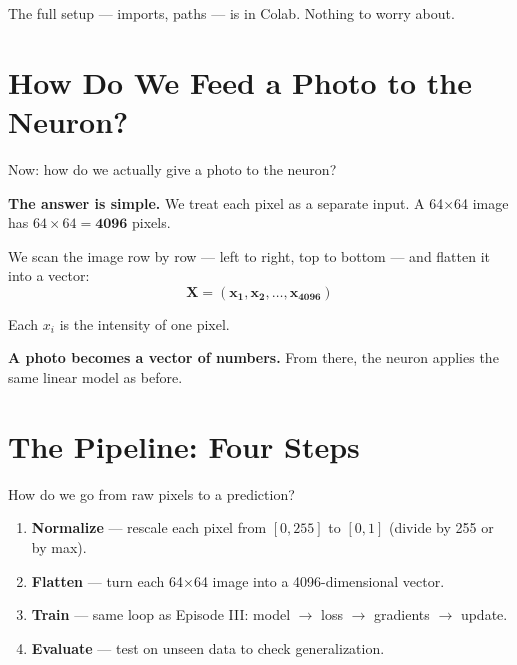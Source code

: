 \documentclass[11pt]{article}
\begin{document}
\vspace{0.5em}

\noindent The full setup — imports, paths — is in Colab. Nothing to worry about.

\vspace{1em}

\section*{How Do We Feed a Photo to the Neuron?}

\vspace{0.5em}

\noindent Now: how do we actually give a photo to the neuron?

\noindent\textbf{The answer is simple.}  
We treat each pixel as a separate input.  
A 64×64 image has $64 \times 64 = \boldsymbol{4096}$ pixels.

\vspace{0.5em}

We scan the image row by row — left to right, top to bottom — and flatten it into a vector:
\[
\boldsymbol{X = (x_1, x_2, \ldots, x_{4096})}
\]

Each $x_i$ is the intensity of one pixel.

\vspace{1em}

\begin{tcolorbox}[colback=white!98!gray, colframe=gray!30!black, arc=1mm]
\textbf{A photo becomes a vector of numbers.}  
From there, the neuron applies the same linear model as before.
\end{tcolorbox}

\vspace{1em}

\begin{center}
\end{center}

\vspace{1em}

\section*{The Pipeline: Four Steps}

\vspace{0.5em}

How do we go from raw pixels to a prediction?

\begin{enumerate}
    \item \textbf{Normalize} — rescale each pixel from $[0, 255]$ to $[0, 1]$ (divide by 255 or by max).
    \item \textbf{Flatten} — turn each 64×64 image into a 4096-dimensional vector.
    \item \textbf{Train} — same loop as Episode III: model $\to$ loss $\to$ gradients $\to$ update.
    \item \textbf{Evaluate} — test on unseen data to check generalization.
\end{enumerate}
\end{document}
